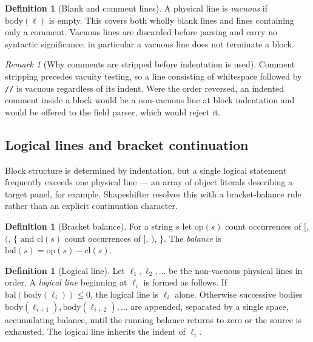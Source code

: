\documentclass[11pt,twocolumn,a4paper]{article}
\theoremstyle{ssthm}
\theoremstyle{definition}
\newtheorem{definition}[theorem]{Definition}
\theoremstyle{remark}
\newtheorem{remark}[theorem]{Remark}
\newcommand{\shk}[1]{\texttt{#1}}
\begin{document}
\begin{definition}[Blank and comment lines]
\label{def:blank}
A physical line is \emph{vacuous} if $\mathrm{body}(\ell)$ is empty. This
covers both wholly blank lines and lines containing only a comment.
Vacuous lines are discarded before parsing and carry no syntactic
significance; in particular a vacuous line does not terminate a block.
\end{definition}

\begin{remark}[Why comments are stripped before indentation is used]
\label{rem:comment-first}
Comment stripping precedes vacuity testing, so a line consisting of
whitespace followed by \shk{//} is vacuous regardless of its indent. Were
the order reversed, an indented comment inside a block would be a
non-vacuous line at block indentation and would be offered to the field
parser, which would reject it.
\end{remark}

\subsection{Logical lines and bracket continuation}

Block structure is determined by indentation, but a single logical
statement frequently exceeds one physical line --- an array of object
literals describing a target panel, for example. Shapeshifter resolves
this with a bracket-balance rule rather than an explicit continuation
character.

\begin{definition}[Bracket balance]
\label{def:balance}
For a string $s$ let $\mathrm{op}(s)$ count occurrences of
$\shk{[}$, $\shk{(}$, $\shk{\{}$ and $\mathrm{cl}(s)$ count occurrences of
$\shk{]}$, $\shk{)}$, $\shk{\}}$. The \emph{balance} is
$\mathrm{bal}(s)=\mathrm{op}(s)-\mathrm{cl}(s)$.
\end{definition}

\begin{definition}[Logical line]
\label{def:logical}
Let $\ell_1,\ell_2,\dots$ be the non-vacuous physical lines in order. A
\emph{logical line} beginning at $\ell_i$ is formed as follows. If
$\mathrm{bal}(\mathrm{body}(\ell_i))\le 0$, the logical line is
$\ell_i$ alone. Otherwise successive bodies
$\mathrm{body}(\ell_{i+1}),\mathrm{body}(\ell_{i+2}),\dots$ are appended,
separated by a single space, accumulating balance, until the running
balance returns to zero or the source is exhausted. The logical line
inherits the indent of $\ell_i$.
\end{definition}
\end{document}
